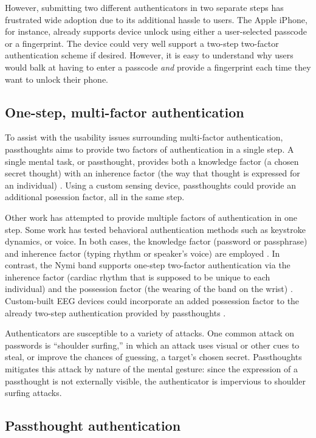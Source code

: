 \documentclass[sigconf]{acmart}
\begin{document}
However, submitting two different 
authenticators in two separate steps has frustrated wide adoption
due to its additional hassle to users. The Apple iPhone, for instance,
already supports device unlock using either a user-selected passcode or a fingerprint. The
device could very well support a two-step two-factor authentication scheme if
desired. However, it is easy to understand why users would balk at having to
enter a passcode \emph{and} provide a fingerprint each time they want to unlock their phone.

\subsection{One-step, multi-factor authentication}
\label{sec:orgce77dd1}

To assist with the usability issues surrounding multi-factor authentication,
passthoughts aims to provide two factors of authentication in a single step.
A single mental task, or passthought, provides both a knowledge factor (a chosen secret thought)
with an inherence factor (the way that thought is expressed for an individual) \cite{Chuang2013b,Johnson2014}.
Using a custom sensing device, passthoughts could provide an additional posession factor, all in the same step.

Other work has attempted to provide multiple factors of authentication in one step.
Some work has tested behavioral authentication methods such as keystroke dynamics, or voice. In both cases, the knowledge factor (password or passphrase) and
inherence factor (typing rhythm or speaker's voice) are employed \cite{Monrose1997}.
In contrast, the Nymi band supports one-step two-factor authentication via the inherence
factor (cardiac rhythm that is supposed to be unique to each individual) and the
possession factor (the wearing of the band on the wrist) \cite{Nymi}.
Custom-built EEG devices could incorporate an added possession factor 
to the already two-step authentication provided by passthoughts \cite{Curran2017}.

Authenticators are susceptible to a variety of attacks. 
One common attack on passwords is ``shoulder surfing,'' in which an attack uses visual or other cues to steal, or improve the chances of guessing, a target's chosen secret. 
Passthoughts mitigates this attack by nature of the mental gesture:
since the expression of a passthought is not externally visible, the authenticator is impervious to shoulder surfing attacks.

\subsection{Passthought authentication}
\label{sec:orgddf4083}
\end{document}
